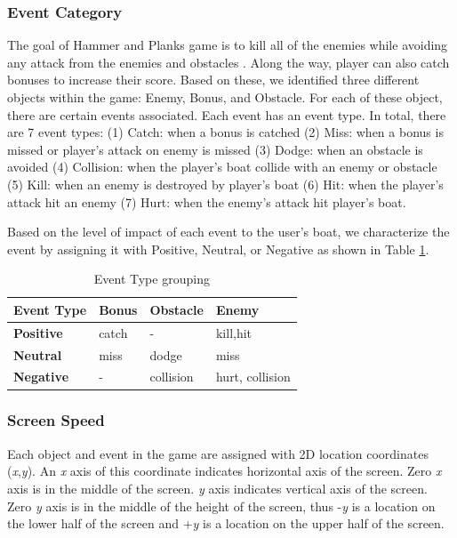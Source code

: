 \documentclass{vgtc}                          %
\begin{document}
\subsubsection{Event Category}
The goal of Hammer and Planks game is to kill all of the enemies while avoiding any attack from the enemies and obstacles \cite{diloreto}. Along the way, player can also catch bonuses to increase their score. Based on these, we identified three different objects within the game: Enemy, Bonus, and Obstacle. For each of these object, there are certain events associated. Each event has an event type. In total, there are 7 event types: (1) Catch: when a bonus is catched (2) Miss: when a bonus is missed or player's attack on enemy is missed (3) Dodge: when an obstacle is avoided (4) Collision: when the player's boat collide with an enemy or obstacle (5) Kill: when an enemy is destroyed by player's boat (6) Hit: when the player's attack hit an enemy (7) Hurt: when the enemy's attack hit player's boat.

Based on the level of impact of each event to the user's boat, we characterize the event by assigning it with Positive, Neutral, or Negative as shown in Table \ref{tblEventType}.
\begin{table}[h]
\begin{center}
    \begin{tabular}{| l | l | l | l |}
    \hline
    Event Type & Bonus & Obstacle & Enemy \\ \hline\hline
    \textbf{Positive} & catch & - & kill,hit\\ \hline
    \textbf{Neutral} & miss & dodge & miss\\ \hline
    \textbf{Negative} & - & collision & hurt, collision\\
    \hline
    \end{tabular}
    \caption {Event Type grouping}
    \label{tblEventType}
\end{center}
\end{table}

\subsubsection{Screen Speed}
Each object and event in the game are assigned with 2D location coordinates (\textit{x},\textit{y}). An \textit{x} axis of this coordinate indicates horizontal axis of the screen. Zero \textit{x} axis is in the middle of the screen. \textit{y} axis indicates vertical axis of the screen. Zero \textit{y} axis is in the middle of the height of the screen, thus -\textit{y} is a location on the lower half of the screen and +\textit{y} is a location on the upper half of the screen.
\end{document}
